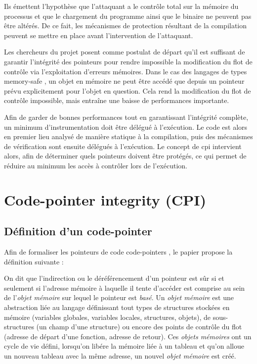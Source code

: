 Ils émettent l'hypothèse que l'attaquant a le contrôle total sur la mémoire du processus et que le chargement du programme ainsi que le binaire ne peuvent pas être altérés. De ce fait, les mécanismes de protection résultant de la compilation peuvent se mettre en place avant l'intervention de l'attaquant.

Les chercheurs du projet posent comme postulat de départ qu'il est suffisant de garantir l'intégrité des pointeurs pour rendre impossible la modification du flot de contrôle via l'exploitation d'erreurs mémoires. Dans le cas des langages de types \og memory-safe \fg, un objet en mémoire ne peut être accédé que depuis un pointeur prévu explicitement pour l'objet en question. Cela rend la modification du flot de contrôle impossible, mais entraîne une baisse de performances importante.

Afin de garder de bonnes performances tout en garantissant l'intégrité complète, un minimum d'instrumentation doit être délégué à l'exécution. Le code est alors en premier lieu analysé de manière statique à la compilation, puis des mécanismes de vérification sont ensuite délégués à l'exécution. Le concept de \og \gls{cpi} \fg \cite{CPIPaper} intervient alors, afin de déterminer quels pointeurs doivent être protégés, ce qui permet de réduire au minimum les accès à contrôler lors de l'exécution.


\section{\og Code-pointer integrity \fg (CPI)}


\subsection{Définition d'un \og code-pointer \fg}

Afin de formaliser les pointeurs de code \og code-pointers \fg, le papier propose la définition suivante :

\og On dit que l'indirection ou le déréférencement d'un pointeur est sûr si et seulement si l'adresse mémoire à laquelle il tente d'accéder est comprise au sein de l'\textit{objet mémoire} sur lequel le pointeur est \textit{basé}. Un \textit{objet mémoire} est une abstraction liée au langage définissant tout types de structures stockées en mémoire (variables globales, variables locales, structures, objets), de sous-structures (un champ d'une structure) ou encore des points de contrôle du flot (adresse de départ d'une fonction, adresse de retour). Ces \textit{objets mémoires} ont un cycle de vie défini, lorsqu'on libére la mémoire liée à un tableau et qu'on alloue un nouveau tableau avec la même adresse, un nouvel \textit{objet mémoire} est créé. \fg

